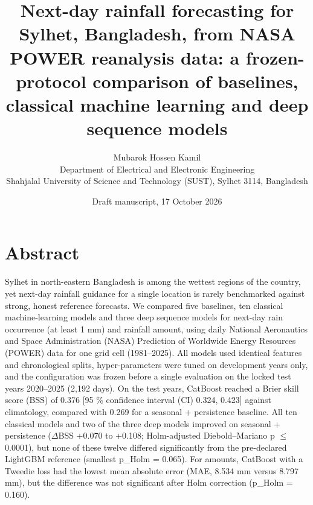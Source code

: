 \documentclass[
]{article}
\title{Next-day rainfall forecasting for Sylhet, Bangladesh, from NASA POWER reanalysis data: a frozen-protocol comparison of baselines, classical machine learning and deep sequence models}
\author{Mubarok Hossen Kamil\\
Department of Electrical and Electronic Engineering\\
Shahjalal University of Science and Technology (SUST), Sylhet 3114, Bangladesh}
\date{Draft manuscript, 17 October 2026}
\begin{document}
\maketitle

\hypertarget{abstract}{%
\section{Abstract}\label{abstract}}

Sylhet in north-eastern Bangladesh is among the wettest regions of the country, yet next-day rainfall guidance for a single location is rarely benchmarked against strong, honest reference forecasts. We compared five baselines, ten classical machine-learning models and three deep sequence models for next-day rain occurrence (at least 1 mm) and rainfall amount, using daily National Aeronautics and Space Administration (NASA) Prediction of Worldwide Energy Resources (POWER) data for one grid cell (1981--2025). All models used identical features and chronological splits, hyper-parameters were tuned on development years only, and the configuration was frozen before a single evaluation on the locked test years 2020--2025 (2,192 days).  %
On the test years, CatBoost reached a Brier skill score (BSS) of 0.376 {[}95 \% confidence interval (CI) 0.324, 0.423{]} against climatology, compared with 0.269 for a seasonal + persistence baseline.  %
All ten classical models and two of the three deep models improved on seasonal + persistence ($\Delta$BSS +0.070 to +0.108; Holm-adjusted Diebold--Mariano p $\le$ 0.0001), but none of these twelve differed significantly from the pre-declared LightGBM reference (smallest p\_Holm = 0.065).  %
For amounts, CatBoost with a Tweedie loss had the lowest mean absolute error (MAE, 8.534 mm versus 8.797 mm), but the difference was not significant after Holm correction (p\_Holm = 0.160).  %
\end{document}

